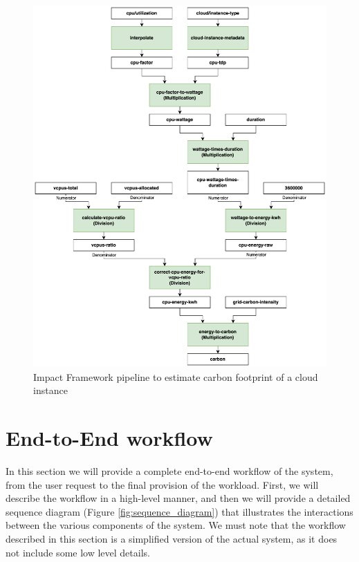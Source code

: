 \begin{figure}[H]
  \centering
  \includegraphics[width=1\linewidth]{images/impact_framework.png}
  \caption{Impact Framework pipeline to estimate carbon footprint of a cloud instance}
  \label{fig:impact_framework}
\end{figure}


\newpage

\section{End-to-End workflow}
\label{sec:e2eflow}

In this section we will provide a complete end-to-end workflow of the system, from the user request to the final provision of the workload.
First, we will describe the workflow in a high-level manner, and then we will provide a detailed sequence diagram (Figure \ref{fig:sequence_diagram}) that illustrates the interactions between the various components of the system.
We must note that the workflow described in this section is a simplified version of the actual system, as it does not include some low level details.

